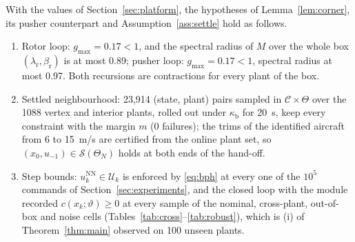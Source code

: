 \documentclass[final,5p,times,twocolumn]{elsarticle}
\newcommand{\numCross}{100}
\newcommand{\numKcGain}{0.17}
\newcommand{\numKcRho}{0.97}
\newcommand{\numKrGain}{0.17}
\newcommand{\numKrRho}{0.89}
\newcommand{\numPlantsFull}{1088}
\newcommand{\numSettleFail}{0}
\newcommand{\numSettlePairs}{23,914}
\begin{document}
\begin{proposition}\label{prop:num}
With the values of Section~\ref{sec:platform}, the hypotheses of Lemma~\ref{lem:corner}, its pusher counterpart and Assumption~\ref{ass:settle} hold as follows.
\begin{enumerate}[label=(\alph*),leftmargin=2em]
\item Rotor loop: $g_{\max}=\numKrGain{}<1$, and the spectral radius of $M$ over the whole box $(\lambda_{\mathrm r},\beta_{\mathrm r})$ is at most \numKrRho{}; pusher loop: $g_{\max}=\numKcGain{}<1$, spectral radius at most \numKcRho{}. Both recursions are contractions for every plant of the box.
\item Settled neighbourhood: \numSettlePairs{} (state, plant) pairs sampled in $\mathcal C\times\Theta$ over the \numPlantsFull{} vertex and interior plants, rolled out under $\kappa_{\mathrm b}$ for \SI{20}{s}, keep every constraint with the margin $m$ (\numSettleFail{} failures); the trims of the identified aircraft from \SI{6}{} to \SI{15}{m/s} are certified from the online plant set, so $(x_0,u_{-1})\in\mathcal S(\Theta_N)$ holds at both ends of the hand-off.
\item Step bounds: $u^{\mathrm{NN}}_k\in\mathcal U_k$ is enforced by \eqref{eq:bph} at every one of the $10^5$ commands of Section~\ref{sec:experiments}, and the closed loop with the module recorded $c(x_k;\vartheta)\ge0$ at every sample of the nominal, cross-plant, out-of-box and noise cells (Tables~\ref{tab:cross}--\ref{tab:robust}), which is (i) of Theorem~\ref{thm:main} observed on \numCross{} unseen plants.
\end{enumerate}
\end{proposition}
\end{document}
